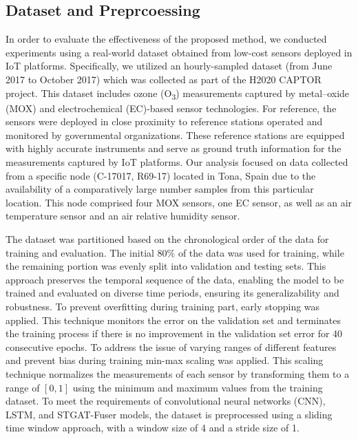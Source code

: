 \documentclass[conference,a4paper]{IEEEtran}
\begin{document}
\subsection{Dataset and Preprcoessing}
In order to evaluate the effectiveness of the proposed method, we conducted experiments using a real-world dataset obtained from low-cost sensors deployed in IoT platforms. Specifically, we utilized an hourly-sampled  dataset (from June 2017 to October 2017) which was collected as part of the H2020 CAPTOR project. This dataset includes ozone (O\textsubscript3) measurements captured by metal–oxide (MOX) and electrochemical (EC)-based sensor technologies\cite{barcelo2021h2020, ripoll2019testing}. For reference, the sensors were deployed in close proximity to reference stations operated and monitored by governmental organizations. These reference stations are equipped with highly accurate instruments and serve as ground truth information for the measurements captured by IoT platforms. Our analysis focused on data collected from a specific node (C-17017, R69-17) located in Tona, Spain due to the availability of a comparatively large number samples from this particular location. This node comprised four MOX sensors, one EC sensor, as well as an air temperature sensor and an air relative humidity sensor.

The dataset was partitioned based on the chronological order of the data for training and evaluation. The initial 80\% of the data was used for training, while the remaining portion was evenly split into validation and testing sets. This approach preserves the temporal sequence of the data, enabling the model to be trained and evaluated on diverse time periods, ensuring its generalizability and robustness. To prevent overfitting during training part, early stopping was applied. This technique monitors the error on the validation set and terminates the training process if there is no improvement in the validation set error for 40 consecutive epochs. To address the issue of varying ranges of different features and prevent bias during training  min-max scaling was applied. This scaling technique normalizes the measurements of each sensor by transforming them to a range of $[0, 1]$  using the minimum and maximum values from the training dataset.
To meet the requirements of convolutional neural networks (CNN), LSTM, and STGAT-Fuser models, the dataset is preprocessed using a sliding time window approach, with a window size of 4 and a stride size of 1. 
\end{document}
